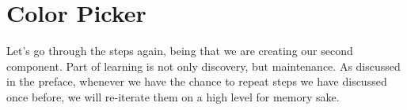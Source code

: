 \maketitle{}
\section{ Color Picker }

Let's go through the steps again, being that we are creating our second
component. Part of learning is not only discovery, but maintenance. As discussed
in the preface, whenever we have the chance to repeat steps we have discussed
once before, we will re-iterate them on a high level for memory sake. 
